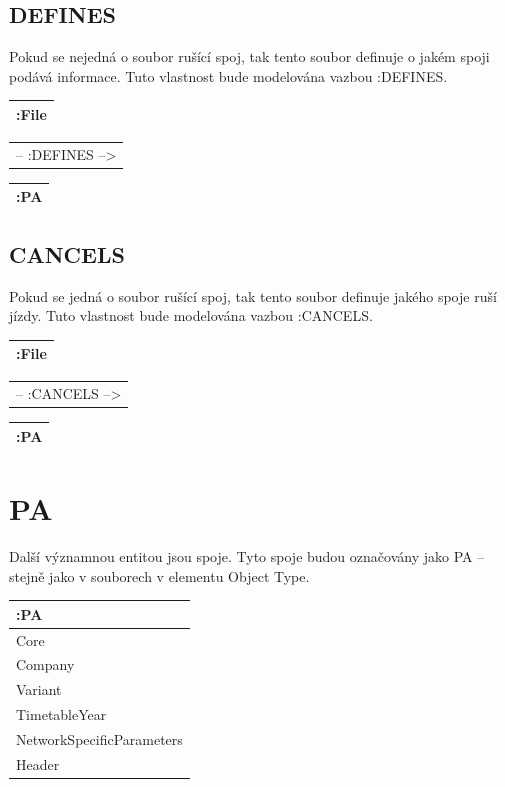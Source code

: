 \documentclass[10pt,xcolor=pdflatex,dvipsnames,table,oneside]{book}
\begin{document}
\subsection{DEFINES}
Pokud se nejedná o soubor rušící spoj, tak tento soubor definuje o jakém spoji podává informace. Tuto vlastnost bude modelována vazbou :DEFINES.

\vspace{1em}
\begin{tabular}{|l|}
    \hline
    :File \\
    \hline
\end{tabular}
\begin{tabular}{c}
    -- :DEFINES --> \\
\end{tabular}
\begin{tabular}{|l|}
    \hline
    :PA \\
    \hline
\end{tabular}

\subsection{CANCELS}
Pokud se jedná o soubor rušící spoj, tak tento soubor definuje jakého spoje ruší jízdy. Tuto vlastnost bude modelována vazbou :CANCELS.

\vspace{1em}
\begin{tabular}{|l|}
    \hline
    :File \\
    \hline
\end{tabular}
\begin{tabular}{c}
    -- :CANCELS --> \\
\end{tabular}
\begin{tabular}{|l|}
    \hline
    :PA \\
    \hline
\end{tabular}

\section{PA}
Další významnou entitou jsou spoje. Tyto spoje budou označovány jako PA -- stejně jako v souborech v elementu Object Type.

\vspace{1em}
\begin{tabular}{|l|}
    \hline
    :PA \\
    \hline
    Core \\
    Company \\
    Variant \\
    TimetableYear \\
    NetworkSpecificParameters \\
    Header \\
    \hline
\end{tabular}
\end{document}

